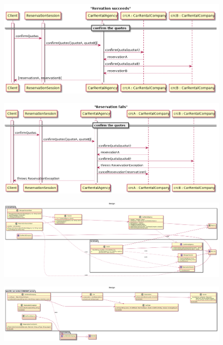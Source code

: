 \documentclass{ds-report}
\begin{document}
\clearpage
	\begin{landscape}
		\begin{figure}
			\label{reservationSucceeds}
			\centering
			\includegraphics[width=\paperwidth]{../diagrams/sequenceDiagrams/reservationSucceeds.png}
		\end{figure}
	\end{landscape}
\clearpage
	\begin{landscape}
		\begin{figure}
			\label{reservationFails}
			\centering
			\includegraphics[width=\paperwidth]{../diagrams/sequenceDiagrams/reservationFails.png}
		\end{figure}
	\end{landscape}
\clearpage
\begin{landscape}
	\begin{figure}
				\label{designreport1}
		\centering
		\includegraphics[width=\paperwidth]{../diagrams/design_report_1.png}
	\end{figure}
\end{landscape}
\clearpage
\begin{landscape}
	\begin{figure}
		\label{designreport2}
		\centering
		\includegraphics[width=\paperwidth]{../diagrams/design_report_2.png}
	\end{figure}
\end{landscape}
\end{document}

